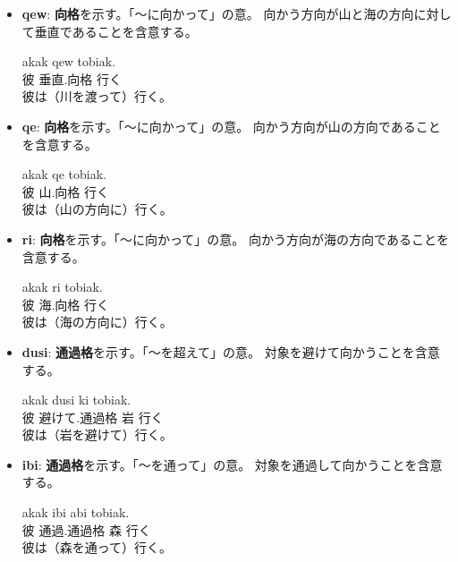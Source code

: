 \begin{itemize}
    \item \textbf{qew}: \textbf{向格}を示す。「～に向かって」の意。
    向かう方向が山と海の方向に対して垂直であることを含意する。
    \begin{exe}
    \ex \gll akak qew tobiak.\\
        彼 垂直.向格 行く\\
    \glt 彼は（川を渡って）行く。
    \end{exe}

    \item \textbf{qe}: \textbf{向格}を示す。「～に向かって」の意。
    向かう方向が山の方向であることを含意する。
    \begin{exe}
    \ex \gll akak qe tobiak.\\
        彼 山.向格 行く\\
    \glt 彼は（山の方向に）行く。
    \end{exe}
    
    \item \textbf{ri}: \textbf{向格}を示す。「～に向かって」の意。
    向かう方向が海の方向であることを含意する。
    \begin{exe}
    \ex \gll akak ri tobiak.\\
        彼 海.向格 行く\\
    \glt 彼は（海の方向に）行く。
    \end{exe}

    \item \textbf{dusi}: \textbf{通過格}を示す。「～を超えて」の意。
    対象を避けて向かうことを含意する。
    \begin{exe}
    \ex \gll akak dusi ki tobiak.\\
        彼 避けて.通過格 岩 行く\\
    \glt 彼は（岩を避けて）行く。
    \end{exe}
    
    \item \textbf{ibi}: \textbf{通過格}を示す。「～を通って」の意。
    対象を通過して向かうことを含意する。
    \begin{exe}
    \ex \gll akak ibi abi tobiak.\\
        彼 通過.通過格 森 行く\\
    \glt 彼は（森を通って）行く。
    \end{exe}
\end{itemize}